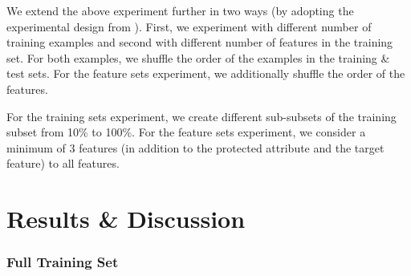 \documentclass{article}
\begin{document}
We extend the above experiment further in two ways (by adopting the
experimental design from ). First, we
experiment with different number of training examples and second with
different number of features in the training set. For both examples,
we shuffle the order of the examples in the training & test sets. For
the feature sets experiment, we additionally shuffle the order of the
features.

For the training sets experiment, we create different sub-subsets of
the training subset from 10\% to 100\%. For the feature sets
experiment, we consider a minimum of 3 features (in addition to the
protected attribute and the target feature) to all features.

\section{Results \& Discussion}\label{sec:results}








\subsubsection{Full Training Set}
\end{document}
